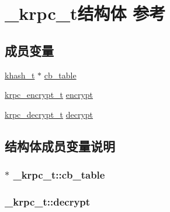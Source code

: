 \hypertarget{a00021}{}\section{\+\_\+krpc\+\_\+t结构体 参考}
\label{a00021}
\subsection*{成员变量}
\begin{DoxyCompactItemize}
\item 
\hyperlink{a00051_aa242a9a673d8677076543d5768798f2c_aa242a9a673d8677076543d5768798f2c}{khash\+\_\+t} $\ast$ \hyperlink{a00021_a50621b5d491ad15671a99b3f8de03906_a50621b5d491ad15671a99b3f8de03906}{cb\+\_\+table}
\item 
\hyperlink{a00051_ae41a67cc07f8dff897ca978e03b1f2d7_ae41a67cc07f8dff897ca978e03b1f2d7}{krpc\+\_\+encrypt\+\_\+t} \hyperlink{a00021_a985e4b2ef424723561b3aae37f00ee50_a985e4b2ef424723561b3aae37f00ee50}{encrypt}
\item 
\hyperlink{a00051_a5cf750f151c90f0589f68fe8c4421f1d_a5cf750f151c90f0589f68fe8c4421f1d}{krpc\+\_\+decrypt\+\_\+t} \hyperlink{a00021_a5f5752bc24a785d6bc69b58e1e552080_a5f5752bc24a785d6bc69b58e1e552080}{decrypt}
\end{DoxyCompactItemize}


\subsection{结构体成员变量说明}
\hypertarget{a00021_a50621b5d491ad15671a99b3f8de03906_a50621b5d491ad15671a99b3f8de03906}{}
\subsubsection[{cb\+\_\+table}]{$\ast$ \+\_\+krpc\+\_\+t\+::cb\+\_\+table}\label{a00021_a50621b5d491ad15671a99b3f8de03906_a50621b5d491ad15671a99b3f8de03906}
\hypertarget{a00021_a5f5752bc24a785d6bc69b58e1e552080_a5f5752bc24a785d6bc69b58e1e552080}{}
\subsubsection[{decrypt}]{ \+\_\+krpc\+\_\+t\+::decrypt}\label{a00021_a5f5752bc24a785d6bc69b58e1e552080_a5f5752bc24a785d6bc69b58e1e552080}
\hypertarget{a00021_a985e4b2ef424723561b3aae37f00ee50_a985e4b2ef424723561b3aae37f00ee50}{}
